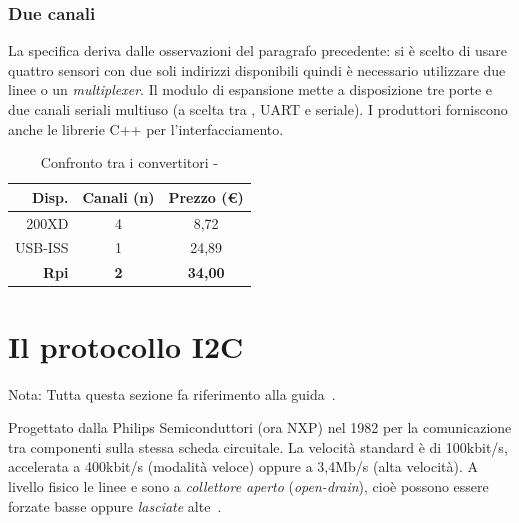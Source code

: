     \subsubsection{Due canali} \label{sssez:2canali}
    La specifica deriva dalle osservazioni del paragrafo precedente:
    si è scelto di usare quattro sensori con due soli indirizzi disponibili
    quindi è necessario utilizzare due linee o un \textit{multiplexer}.
    Il modulo di espansione \emph{} mette a disposizione
    tre porte \usb{} e due canali seriali multiuso
    (a scelta tra \iic{}, { UART} e seriale).
    I produttori forniscono anche le librerie { C++} per l'interfacciamento.
    
	\begin{table}
		\begin{center}
		\caption{Confronto tra i convertitori \iic-\usb}
		\label{tab:convertitori}
		\begin{tabular}{r c c}
Disp.        & Canali (n)  & Prezzo (\euro)\\
			\hline
200XD        &  4          & 8,72\\
USB-ISS      &  1          & 24,89\\
\textbf{Rpi} &  \textbf{2} & \textbf{34,00}\\
			\hline
		\end{tabular}
		\end{center}
	\end{table}

% 

\section{Il protocollo I2C} \label{sez:protocollo_i2c}
{Nota: Tutta questa sezione fa riferimento alla guida~\cite{cit:primer}.}

    Progettato dalla Philips Semiconduttori (ora NXP) nel 1982
    per la comunicazione tra componenti sulla stessa scheda circuitale.
    La velocità standard è di 100kbit/s,
    accelerata a 400kbit/s (modalità veloce)
    oppure a 3,4Mb/s (alta velocità).
    A livello fisico le linee \sda{} e \scl{} sono a \emph{collettore aperto}
    (\textit{open-drain}),
    cioè possono essere forzate basse oppure \emph{lasciate} alte~\cite{cit:primer}.
	
